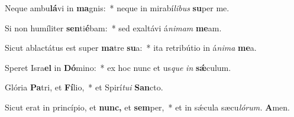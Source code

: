 \item Neque ambu\textbf{lá}vi in \textbf{ma}gnis:~* neque in mirabí\hspace{0.03em}\textit{libus} \textbf{su}per me.
\item Si non humíliter \textbf{sen}ti\textbf{é}bam:~* sed exaltávi á\hspace{0.03em}\textit{nimam} \textbf{me}am.
\item Sicut ablactátus est super \textbf{ma}tre \textbf{su}a:~* ita retribútio in á\hspace{0.03em}\textit{nima} \textbf{me}a.
\item Speret Isra\textbf{el} in \textbf{Dó}mino:~* ex hoc nunc et us\hspace{0.03em}\textit{que} \textit{in} \textbf{sǽ}culum.
\item Glória \textbf{Pa}tri, et \textbf{Fí}lio,~* et Spirí\hspace{0.03em}\textit{tui} \textbf{San}cto.
\item Sicut erat in princípio, et \textbf{nunc,} et \textbf{sem}per,~* et in sǽcula sæcu\hspace{0.03em}\textit{lórum.} \textbf{A}men.
